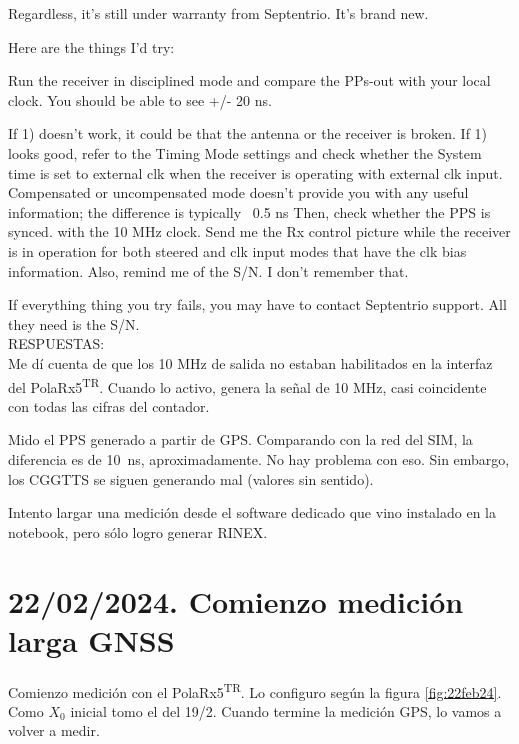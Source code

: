 \documentclass[11pt]{article}
\newcommand{\polar}[0]{PolaRx5\textsuperscript{TR}}
\begin{document}
Regardless, it’s still under warranty from Septentrio. It’s brand new.

Here are the things I’d try:

Run the receiver in disciplined mode and compare the PPs-out with your local clock.
                 You should be able to see +/- 20 ns.

If 1) doesn’t work, it could be that the antenna or the receiver is broken.
If 1) looks good, refer to the Timing Mode settings and check whether the System time is set to external clk when the receiver is operating with external clk input. Compensated or uncompensated mode doesn’t provide you with any useful information; the difference is typically ~0.5 ns
Then, check whether the PPS is synced. with the 10 MHz clock.
Send me the Rx control picture while the receiver is in operation for both steered and clk input modes that have the clk bias information. Also, remind me of the S/N. I don’t remember that.
 

If everything thing you try fails, you may have to contact Septentrio support. All they need is the S/N.\\

RESPUESTAS:\\

Me dí cuenta de que los 10 MHz de salida no estaban habilitados en la interfaz del \polar. Cuando lo activo, genera la señal de 10 MHz, casi coincidente con todas las cifras del contador.

Mido el PPS generado a partir de GPS. Comparando con la red del SIM, la diferencia es de \SI{10}{\nano\second}, aproximadamente. No hay problema con eso. 
Sin embargo, los CGGTTS se siguen generando mal (valores sin sentido). 

Intento largar una medición desde el software dedicado que vino instalado en la notebook, pero sólo logro generar RINEX.


\section{22/02/2024. Comienzo medición larga GNSS}

Comienzo medición con el \polar. Lo configuro según la figura \ref{fig:22feb24}. Como  $X_0$ inicial tomo el del 19/2. Cuando termine la medición GPS, lo vamos a volver a medir.
\end{document}
